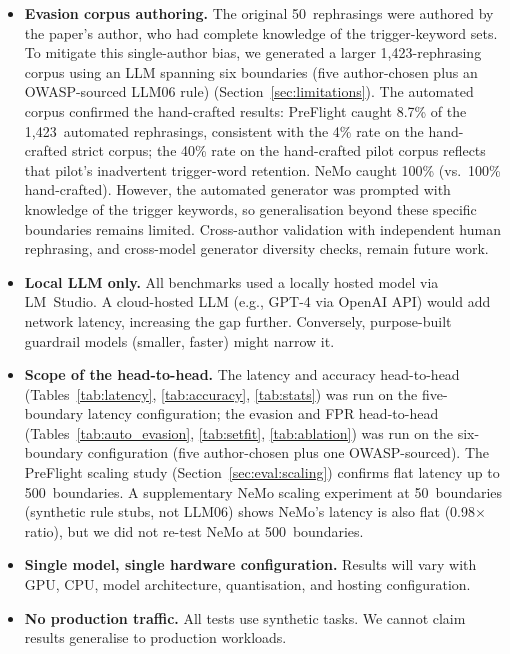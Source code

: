 \documentclass[11pt,a4paper]{article}
\begin{document}
\begin{itemize}[nosep]
  \item \textbf{Evasion corpus authoring.} The original 50~rephrasings were
    authored by the paper's author, who had complete knowledge of
    the trigger-keyword sets.  To mitigate this single-author bias,
    we generated a larger 1{,}423-rephrasing corpus using an LLM
    spanning six boundaries (five author-chosen plus an
    OWASP-sourced LLM06 rule)
    (Section~\ref{sec:limitations}).  The automated corpus confirmed
    the hand-crafted results: PreFlight caught 8.7\% of the
    1{,}423~automated rephrasings, consistent with the 4\% rate on the
    hand-crafted strict corpus; the 40\% rate on the hand-crafted
    pilot corpus reflects that pilot's inadvertent trigger-word
    retention.  NeMo caught 100\% (vs.\ 100\% hand-crafted).  However,
    the automated generator was prompted with knowledge of the
    trigger keywords, so generalisation beyond these specific
    boundaries remains limited.
    Cross-author validation with independent human rephrasing, and
    cross-model generator diversity checks, remain future work.
  \item \textbf{Local LLM only.} All benchmarks used a locally hosted
    model via LM~Studio. A cloud-hosted LLM (e.g., GPT-4 via OpenAI API)
    would add network latency, increasing the gap further. Conversely,
    purpose-built guardrail models (smaller, faster) might narrow it.
  \item \textbf{Scope of the head-to-head.}  The latency and accuracy
    head-to-head (Tables~\ref{tab:latency}, \ref{tab:accuracy},
    \ref{tab:stats}) was run on the five-boundary latency
    configuration; the evasion and FPR head-to-head
    (Tables~\ref{tab:auto_evasion}, \ref{tab:setfit},
    \ref{tab:ablation}) was run on the six-boundary configuration
    (five author-chosen plus one OWASP-sourced). The PreFlight scaling
    study (Section~\ref{sec:eval:scaling}) confirms flat latency up to
    500~boundaries. A supplementary NeMo scaling experiment at
    50~boundaries (synthetic rule stubs, not LLM06) shows NeMo's
    latency is also flat (0.98$\times$ ratio), but we did not re-test
    NeMo at 500~boundaries.
  \item \textbf{Single model, single hardware configuration.} Results
    will vary with GPU, CPU, model architecture, quantisation, and
    hosting configuration.
  \item \textbf{No production traffic.} All tests use synthetic tasks.
    We cannot claim results generalise to production workloads.

\end{itemize}
\end{document}

